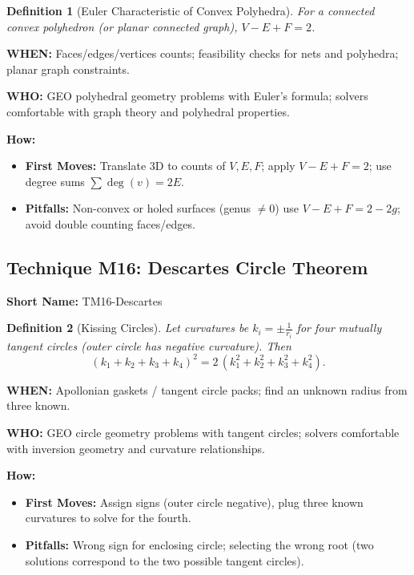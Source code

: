 \documentclass[12pt]{article}
\newtheorem{definition}{Definition}[section]
\begin{document}
\begin{definition}[Euler Characteristic of Convex Polyhedra]
For a connected convex polyhedron (or planar connected graph), $V-E+F=2$.
\end{definition}

\textbf{WHEN:} Faces/edges/vertices counts; feasibility checks for nets and polyhedra; planar graph constraints.

\textbf{WHO:} GEO polyhedral geometry problems with Euler's formula; solvers comfortable with graph theory and polyhedral properties.

\textbf{How:}
\begin{itemize}
    \item \textbf{First Moves:} Translate 3D to counts of $V,E,F$; apply $V-E+F=2$; use degree sums $\sum \deg(v)=2E$.
    \item \textbf{Pitfalls:} Non-convex or holed surfaces (genus $\neq 0$) use $V-E+F=2-2g$; avoid double counting faces/edges.
\end{itemize}

\subsection{Technique M16: Descartes Circle Theorem}
\textbf{Short Name:} TM16-Descartes

\begin{definition}[Kissing Circles]
Let curvatures be $k_i=\pm\tfrac{1}{r_i}$ for four mutually tangent circles (outer circle has negative curvature). Then
\[
 (k_1+k_2+k_3+k_4)^2 = 2\,(k_1^2+k_2^2+k_3^2+k_4^2).
\]
\end{definition}

\textbf{WHEN:} Apollonian gaskets / tangent circle packs; find an unknown radius from three known.

\textbf{WHO:} GEO circle geometry problems with tangent circles; solvers comfortable with inversion geometry and curvature relationships.

\textbf{How:}
\begin{itemize}
    \item \textbf{First Moves:} Assign signs (outer circle negative), plug three known curvatures to solve for the fourth.
    \item \textbf{Pitfalls:} Wrong sign for enclosing circle; selecting the wrong root (two solutions correspond to the two possible tangent circles).
\end{itemize}

\end{document}
